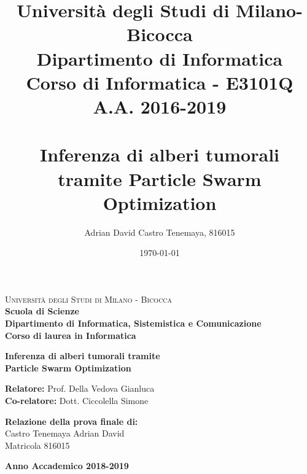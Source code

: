 \documentclass[a4paper,12pt,openright]{book}
\author{Adrian David Castro Tenemaya, 816015}
\title{Università degli Studi di Milano-Bicocca \\{\small Dipartimento di Informatica \\ Corso di Informatica - E3101Q\\A.A. 2016-2019\\\vspace*{0.55in} \ }\\ Inferenza di alberi tumorali tramite Particle Swarm Optimization \vspace*{1.25in}}
\date{\today}
\begin{document}

\begin{titlepage}
    \noindent
    \begin{minipage}[t]{0.19\textwidth}
    \end{minipage}
    \begin{minipage}[t]{0.81\textwidth}
        \textsc{Università degli Studi di Milano - Bicocca} \\
        \textbf{Scuola di Scienze} \\
        \textbf{Dipartimento di Informatica, Sistemistica e Comunicazione} \\
        \textbf{Corso di laurea in Informatica} \\
        \par
    \end{minipage}
    \vspace{40mm}
    \begin{center}
        \large {}
        \textbf{Inferenza di alberi tumorali tramite \\ Particle Swarm Optimization}
        \par
    \end{center}
    \vspace{50mm}
    \noindent
    {\large \textbf{Relatore:} Prof. Della Vedova Gianluca } \\
    \noindent
    {\large \textbf{Co-relatore:} Dott. Ciccolella Simone}
    \vspace{15mm}
    \begin{flushright}
        {\large \textbf{Relazione della prova finale di:}} \\
        \large{Castro Tenemaya Adrian David} \\
        \large{Matricola 816015}
    \end{flushright}
    \vspace{40mm}
    \begin{center}
        {\large{\bf Anno Accademico 2018-2019}}
    \end{center}
    \restoregeometry
\end{titlepage}
\end{document}
